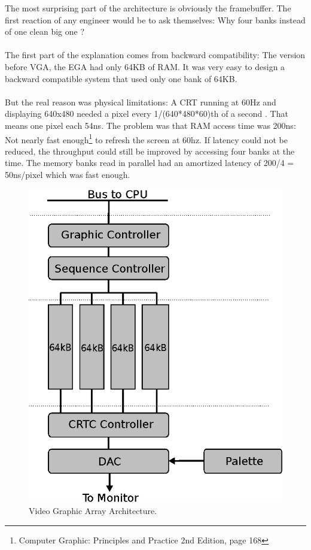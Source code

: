 \documentclass[book.tex]{subfiles}
\begin{document}
The most surprising part of the architecture is obviously the framebuffer. The first reaction of any engineer would be to ask themselves: Why four banks instead of one clean big one ?\\
\\
The first part of the explanation comes from backward compatibility: The version before VGA, the EGA had only 64KB of RAM. It was very easy to design a backward compatible system that used only one bank of 64KB.\\
\\
But the real reason was physical limitations: A CRT running at 60Hz and displaying 640x480 needed a pixel every 1/(640*480*60)th of a second . That means one pixel each 54ns. The problem was that RAM access time was 200ns: Not nearly fast enough\footnote{Computer Graphic: Principles and Practice 2nd Edition, page 168} to refresh the screen at 60hz. If latency could not be reduced, the throughput could still be improved by accessing four banks at the time. The memory banks read in parallel had an amortized latency of 200/4 = 50ns/pixel which was fast enough.


\begin{figure}[H]
\centering
\includegraphics[scale=1.2]{imgs/vga.eps}
\caption{Video Graphic Array Architecture.}
\label{fig:vga_arch}
\end{figure}
\end{document}
